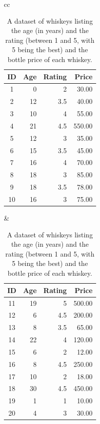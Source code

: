 \documentclass[xcolor={table}]{beamer}
\begin{document}
 \begin{frame} 
\begin{table}[htb]
\caption{A dataset of whiskeys listing the age (in years) and the rating (between 1 and 5, with 5 being the best) and the bottle price of each whiskey. }
\label{table:whiskeyPriceModel}
\begin{center}
\begin{footnotesize}
\begin{tabular}{cc}
		\hline
			\begin{minipage}{0.45\textwidth}
					\begin{tabular}[ht]{crrr} 
\textbf{ID}	 & \textbf{Age} & \textbf{Rating} & \textbf{Price}\\
\hline
1	&0	&2	&30.00\\
2	&12	&3.5	&40.00\\
3	&10	&4	&55.00\\
4	&21	&4.5	&550.00\\
5	&12	&3	&35.00\\
6	&15	&3.5	&45.00\\
7	&16	&4	&70.00\\
8	&18	&3	&85.00\\
9	&18	&3.5	&78.00\\
10	&16	&3	&75.00\\
\hline
					\end{tabular}
			\end{minipage}
			&
			\begin{minipage}{0.45\textwidth}
					\begin{tabular}[ht]{crrr} 
\textbf{ID}	 & \textbf{Age} & \textbf{Rating} & \textbf{Price}\\
\hline
11	&19	&5	&500.00\\
12	&6	&4.5	&200.00\\
13	&8	&3.5	&65.00\\
14	&22	&4	&120.00\\
15	&6	&2	&12.00\\
16	&8	&4.5	&250.00\\
17	&10	&2	&18.00\\
18	&30	&4.5	&450.00\\
19	&1	&1	&10.00\\
20	&4	&3	&30.00\\
\hline
				\end{tabular}
			\end{minipage}\\
\end{tabular}
\end{footnotesize}
\end{center}
\end{table}
\end{frame} 
\end{document}
